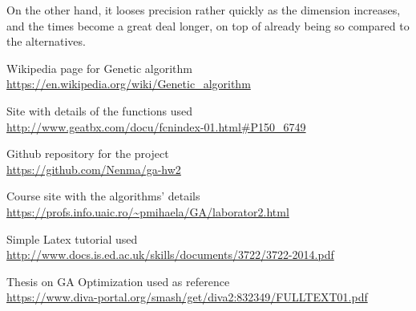 \documentclass{article}
\begin{document}
On the other hand, it looses precision rather quickly as the dimension 
increases, and the times become a great deal longer, on top of already being
so compared to the alternatives.

\begin{thebibliography}{9}

    Wikipedia page for Genetic algorithm \\
    \url{https://en.wikipedia.org/wiki/Genetic_algorithm}

    Site with details of the functions used \\
    \url{http://www.geatbx.com/docu/fcnindex-01.html#P150_6749}

    Github repository for the project \\
    \url{https://github.com/Nenma/ga-hw2}

    Course site with the algorithms' details \\
    \url{https://profs.info.uaic.ro/~pmihaela/GA/laborator2.html}
  
    Simple Latex tutorial used \\
    \url{http://www.docs.is.ed.ac.uk/skills/documents/3722/3722-2014.pdf}

    Thesis on GA Optimization used as reference \\
    \url{https://www.diva-portal.org/smash/get/diva2:832349/FULLTEXT01.pdf}

\end{thebibliography}
\end{document}
